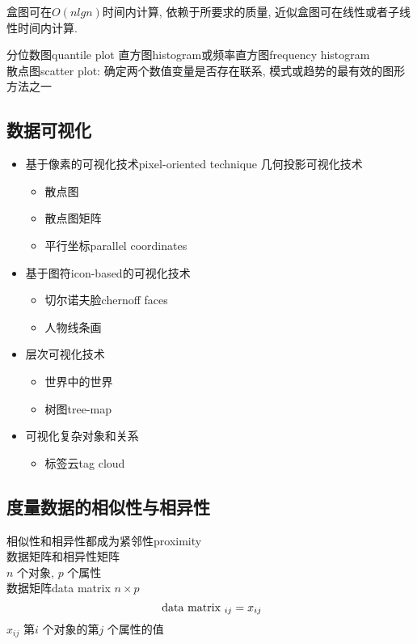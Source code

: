 \documentclass{article}
\begin{document}
盒图可在$O(nlgn)$时间内计算, 依赖于所要求的质量, 近似盒图可在线性或者子线性时间内计算.

分位数图quantile plot
直方图histogram或频率直方图frequency histogram\\
散点图scatter plot: 确定两个数值变量是否存在联系, 模式或趋势的最有效的图形方法之一\\

\subsection{数据可视化}
\begin{itemize}
\item 基于像素的可视化技术pixel-oriented technique
几何投影可视化技术
	\begin{itemize}
	\item 散点图
	\item 散点图矩阵
    \item 平行坐标parallel coordinates
	\end{itemize}
\item 基于图符icon-based的可视化技术
	\begin{itemize}
	\item 切尔诺夫脸chernoff faces
	\item 人物线条画
	\end{itemize}
\item 层次可视化技术
	\begin{itemize}
	\item 世界中的世界
	\item 树图tree-map
	\end{itemize}
\item 可视化复杂对象和关系
	\begin{itemize}
	\item 标签云tag cloud
	\end{itemize}
\end{itemize}
	
\subsection{度量数据的相似性与相异性}
相似性和相异性都成为紧邻性proximity\\
数据矩阵和相异性矩阵\\
$n$ 个对象, $p$ 个属性\\
数据矩阵data matrix $n \times p$\\
$$
\text{ data matrix }_{ij} = x_{ij}
$$
$x_{ij}$ 第$i$ 个对象的第$j$ 个属性的值
\end{document}
